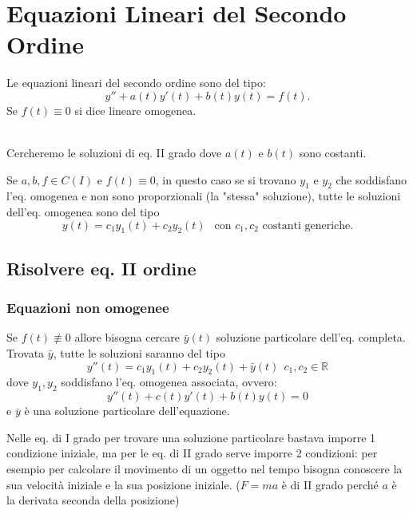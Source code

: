 \section{Equazioni Lineari del Secondo Ordine}
\begin{definizione}
    Le equazioni lineari del secondo ordine sono del tipo:
    \begin{equation}
        y'' + a(t)y'(t)+b(t)y(t) = f(t).
    \end{equation}
    Se $f(t)\equiv 0$ si dice lineare omogenea.
\end{definizione}
\leavevmode \\
Cercheremo le soluzioni di eq. II grado dove $a(t)$ e $b(t)$ sono costanti.
\begin{proprieta}
    Se $a,b,f \in C(I)$ e $f(t)\equiv 0$, in questo caso se si trovano $y_1$ e $y_2$ che soddisfano l'eq. omogenea e non sono proporzionali (la "stessa" soluzione), tutte le soluzioni dell'eq. omogenea sono del tipo
    \begin{equation}
        y(t) = c_1y_1(t) + c_2y_2(t)\ \ \text{ con $c_1, c_2$ costanti generiche.}
    \end{equation}
\end{proprieta}

\subsection{Risolvere eq. II ordine}
\subsubsection{Equazioni non omogenee}
Se $f(t) \not \equiv 0$ allore bisogna cercare $\bar{y}(t)$ soluzione particolare dell'eq. completa. Trovata $\bar{y}$, tutte le soluzioni saranno del tipo
\begin{equation}
    y''(t)=c_1y_1(t)+c_2y_2(t) + \bar{y}(t)\ \ c_1, c_2\in \mathbb{R}
\end{equation}
dove $y_1, y_2$ soddisfano l'eq. omogenea associata, ovvero:
\begin{equation}
    y''(t) + c(t)y'(t) + b(t)y(t) = 0
\end{equation}
e $\bar{y}$ è una soluzione particolare dell'equazione.
\begin{osservazione}
    Nelle eq. di I grado per trovare una soluzione particolare bastava imporre 1 condizione iniziale, ma per le eq. di II grado serve imporre 2 condizioni: per esempio per calcolare il movimento di un oggetto nel tempo bisogna conoscere la sua velocità iniziale e la sua posizione iniziale. ($F = ma$ è di II grado perché $a$ è la derivata seconda della posizione)
\end{osservazione}

